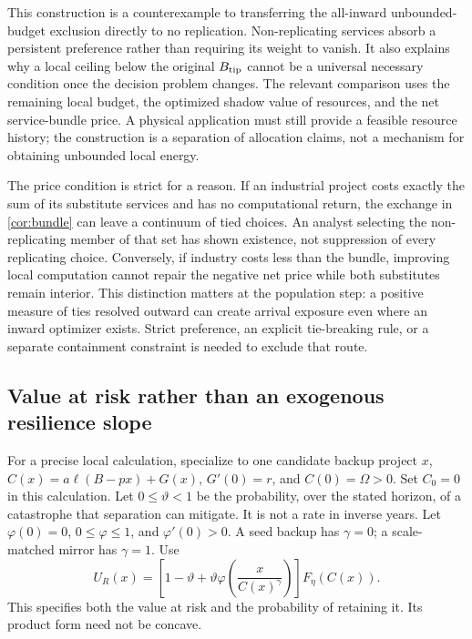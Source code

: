 This construction is a counterexample to transferring the all-inward
unbounded-budget exclusion directly to no replication. Non-replicating
services absorb a persistent preference rather than requiring its weight
to vanish. It also explains why a local ceiling below the original
$B_{\rm tip}$ cannot be a universal necessary condition once the decision
problem changes. The relevant comparison uses the remaining local budget,
the optimized shadow value of resources, and the net service-bundle price.
A physical application must still provide a feasible resource history;
the construction is a separation of allocation claims, not a mechanism
for obtaining unbounded local energy.

The price condition is strict for a reason. If an industrial project
costs exactly the sum of its substitute services and has no computational
return, the exchange in \cref{cor:bundle} can leave a continuum of tied
choices. An analyst selecting the non-replicating member of that set has
shown existence, not suppression of every replicating choice. Conversely,
if industry costs less than the bundle, improving local computation cannot
repair the negative net price while both substitutes remain interior.
This distinction matters at the population step: a positive measure of
ties resolved outward can create arrival exposure even where an inward
optimizer exists. Strict preference, an explicit tie-breaking rule, or a
separate containment constraint is needed to exclude that route.

\subsection{Value at risk rather than an exogenous resilience slope}
For a precise local calculation, specialize to one candidate backup
project $x$, $C(x)=a\ell(B-px)+G(x)$, $G'(0)=r$, and $C(0)=\Omega>0$.
Set $C_0=0$ in this calculation. Let $0\leq\vartheta<1$ be the
probability, over the stated horizon, of a catastrophe that separation
can mitigate. It is not a rate in inverse years. Let $\varphi(0)=0$,
$0\leq\varphi\leq1$, and $\varphi'(0)>0$. A seed backup has
$\gamma=0$; a scale-matched mirror has $\gamma=1$. Use
\begin{equation}
 U_R(x)=\left[1-\vartheta+\vartheta
       \varphi\!\left(\frac{x}{C(x)^\gamma}\right)\right]F_\eta(C(x)).
 \label{eq:risk-utility}
\end{equation}
This specifies both the value at risk and the probability of retaining it.
Its product form need not be concave.

